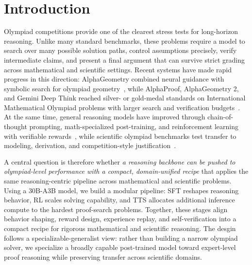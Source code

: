 \documentclass{llmxive}
\begin{document}
\section{Introduction}
Olympiad competitions provide one of the clearest stress tests for long-horizon
reasoning. Unlike many standard benchmarks, these problems require a model to 
search over many possible solution paths, control assumptions precisely, verify
intermediate claims, and present a final argument that can survive strict
grading across mathematical and scientific settings. Recent systems have made
rapid progress in this direction: AlphaGeometry combined neural guidance with
symbolic search for olympiad geometry~\citep{trinh2024alphageometry}, while
AlphaProof, AlphaGeometry 2, and Gemini Deep Think reached silver- or
gold-medal standards on International Mathematical Olympiad problems with
larger search and verification budgets~\citep{deepmind2024alphaproof,deepmind2025geminiimo}.
At the same time, general reasoning models have improved through
chain-of-thought prompting, math-specialized post-training, and reinforcement
learning with verifiable rewards~\citep{wei2022chain,shao2024deepseekmath,yang2024qwen25math,r1,yan2025learning,exgrpo}, while scientific olympiad benchmarks test transfer to modeling, derivation, and competition-style justification~\citep{olympiadbench,chen2025p1,luo2026p1vl}.


A central question is therefore whether \textit{a reasoning backbone can be pushed to olympiad-level performance with a compact, domain-unified recipe} that
applies the same reasoning-centric pipeline across mathematical and scientific problems. 
Using
a 30B-A3B model, we build a modular pipeline: SFT reshapes reasoning behavior, RL scales solving capability, and TTS allocates additional inference compute to the
hardest proof-search problems. Together, these stages align behavior shaping, reward design, experience replay, and self-verification into a compact recipe for rigorous
mathematical and scientific reasoning. The desgin follows a specializable-generalist view: rather than building a narrow olympiad solver, we specialize a broadly capable post-trained model toward expert-level proof reasoning while preserving transfer across scientific domains.
  
\end{document}
